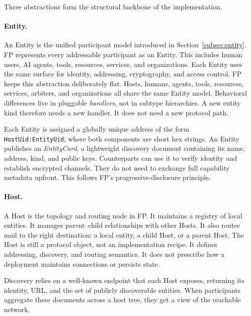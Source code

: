 Three abstractions form the structural backbone of the implementation.

\paragraph{Entity.}
An Entity is the unified participant model introduced in Section~\ref{subsec:entity}. FP represents every addressable participant as an Entity. This includes human users, AI agents, tools, resources, services, and organizations. Each Entity uses the same surface for identity, addressing, cryptography, and access control.
FP keeps this abstraction deliberately flat. Hosts, humans, agents, tools, resources, services, arbiters, and organizations all share the same Entity model. Behavioral differences live in pluggable \emph{handlers}, not in subtype hierarchies. A new entity kind therefore needs a new handler. It does not need a new protocol path.

Each Entity is assigned a globally unique address of the form
\texttt{HostUid:EntityUid}, where both components are short hex strings.
An Entity publishes an \emph{EntityCard}, a lightweight discovery
document containing its name, address, kind, and public keys. Counterparts can use it to verify identity and establish encrypted channels. They do not need to exchange full capability metadata upfront. This follows FP's progressive-disclosure principle.

\paragraph{Host.}
A Host is the topology and routing node in FP. It maintains a registry of local entities. It manages parent--child relationships with other Hosts. It also routes mail to the right destination: a local entity, a child Host, or a parent Host.
The Host is still a protocol object, not an implementation recipe. It defines addressing, discovery, and routing semantics. It does not prescribe how a deployment maintains connections or persists state.

Discovery relies on a well-known endpoint that each Host exposes,
returning its identity, URL, and the set of publicly discoverable
entities. When participants aggregate these documents across a host tree, they get a view of the reachable network.


